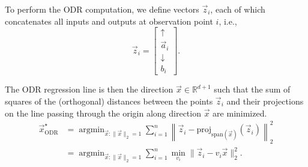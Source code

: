 \documentclass[10pt]{article}
\newcommand{\RR}{\mathbb{R}}
\DeclareMathOperator*{\argmin}{argmin}
\begin{document}
To perform the ODR computation, we define vectors $\vec{z}_i$, each of which concatenates all inputs and outputs at observation point $i$, i.e.,
\begin{equation}
\vec{z}_i = \begin{bmatrix} \uparrow \\ \vec{a}_i \\ \downarrow \\ b_i \end{bmatrix}.
\end{equation}

The ODR regression line is then the direction $\vec{x} \in \RR^{d+1}$ such that the sum of squares of the (orthogonal) distances between the points $\vec{z}_i$ and their projections on the line passing through the origin along direction $\vec{x}$ are minimized.
\begin{align}
\vec{x}^\star_{\text{ODR}} &= \argmin_{\vec{x}:\|\vec{x}\|_2=1} \sum_{i=1}^{n} \left\| \vec{z}_i - \text{proj}_{\text{span}(\vec{x})}(\vec{z}_i) \right\|_2^2 \\
&= \argmin_{\vec{x}:\|\vec{x}\|_2=1} \sum_{i=1}^{n} \min_{v_i} \|\vec{z}_i - v_i \vec{x}\|_2^2.
\end{align}
\end{document}
